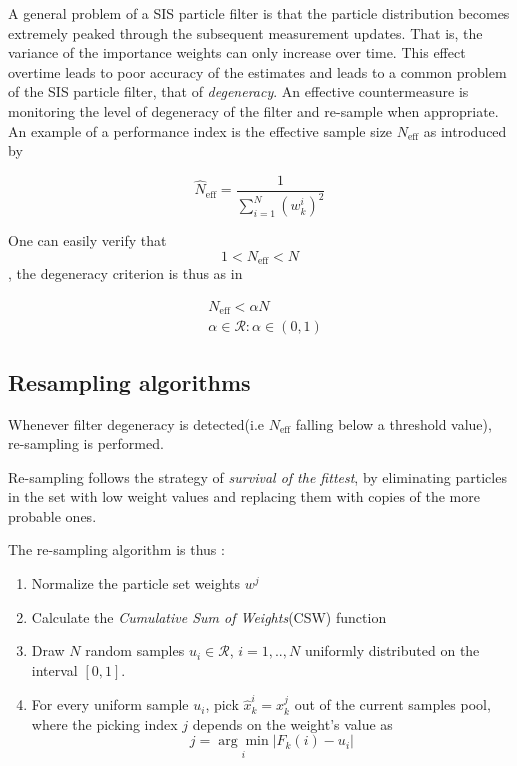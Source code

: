 A general problem of a SIS particle filter is that the particle distribution becomes extremely peaked through the subsequent measurement updates. That is, the variance of the importance weights can only increase over time. This effect overtime leads to poor accuracy of the estimates and leads to a common problem of the SIS particle filter, that of \emph{degeneracy}. An effective countermeasure is monitoring the level of degeneracy of the filter and re-sample when appropriate. An example of a performance index is the effective sample size $N_{\text{eff}}$ as introduced by \cite{Kong1994}


\begin{equation}
\hat{N}_{\text{eff}} = \frac{1}{\sum_{i=1}^{N}(w_k^i)^2}
\end{equation}


One can easily verify that $$1 < N_{\text{eff}} < N$$ , the degeneracy criterion is thus as in 

\begin{equation}\label{eq:criterion_degeneracy}
\begin{aligned}
&N_{\text{eff}} < \alpha N \\&\alpha \in \mathcal{R}: \alpha \in (0,1)
\end{aligned}
\end{equation}

\subsection{Resampling algorithms}


Whenever filter degeneracy is detected(i.e $N_{\text{eff}}$ falling below a threshold value), re-sampling is performed.


Re-sampling follows the strategy of \emph{survival of the fittest}, by eliminating particles in the set with low weight values and replacing them with copies of the more probable ones.


The re-sampling algorithm is thus \cite{Ristic2004}:

\begin{enumerate}
	\item Normalize the particle set weights $w^j$
	\item Calculate the \emph{Cumulative Sum of Weights}(CSW) function
	\item Draw $N$ random samples $u_i \in \mathcal{R}$, $i=1,..,N$ uniformly distributed on the interval $[0,1]$.
	\item For every uniform sample $u_i$, pick $\hat{x}_k^i = x_k^j$ out of the current samples pool, where the picking index $j$ depends on the weight's value as \[ j = \underset{i}{\arg\min} |{F_k(i)-u_i}| \]

\end{enumerate}

